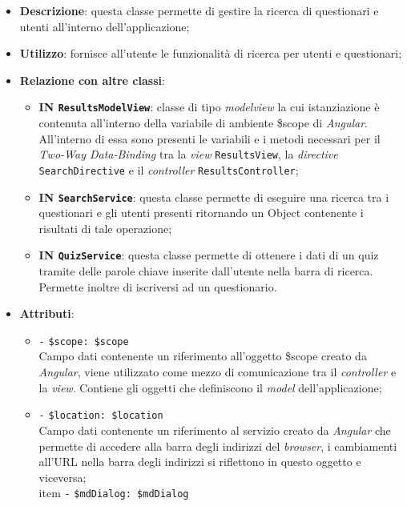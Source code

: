 \begin{itemize}
	\item \textbf{Descrizione}: questa classe permette di gestire la ricerca di questionari e utenti all'interno dell'applicazione;
	\item \textbf{Utilizzo}: fornisce all'utente le funzionalità di ricerca per utenti e questionari;
	\item \textbf{Relazione con altre classi}:
	\begin{itemize}
		\item \textbf{IN \texttt{ResultsModelView}}: classe di tipo \textit{modelview} la cui istanziazione è contenuta all'interno della variabile di ambiente \$scope di \textit{Angular}. All'interno di essa sono presenti le variabili e i metodi necessari per il \textit{Two-Way Data-Binding} tra la \textit{view} \texttt{ResultsView}, la \textit{directive} \texttt{SearchDirective} e il \textit{controller} \texttt{ResultsController};
		\item \textbf{IN \texttt{SearchService}}: questa classe permette di eseguire una ricerca tra i questionari e gli utenti presenti ritornando un Object contenente i risultati di tale operazione;
		\item \textbf{IN \texttt{QuizService}}: questa classe permette di ottenere i dati di un quiz tramite delle parole chiave inserite dall'utente nella barra di ricerca. Permette inoltre di iscriversi ad un questionario.
	\end{itemize}
	\item \textbf{Attributi}:
	\begin{itemize}
		\item \texttt{-} \texttt{\$scope: \$scope} \\
		Campo dati contenente un riferimento all'oggetto \$scope creato da \textit{Angular}, viene utilizzato come mezzo di comunicazione tra il \textit{controller} e la \textit{view}. Contiene gli oggetti che definiscono il \textit{model} dell'applicazione;
		\item \texttt{-} \texttt{\$location: \$location} \\
		Campo dati contenente un riferimento al servizio creato da \textit{Angular} che permette di accedere alla barra degli indirizzi del \textit{browser}, i cambiamenti all'URL nella barra degli indirizzi si riflettono in questo oggetto e viceversa;
		\\item \texttt{-} \texttt{\$mdDialog: \$mdDialog} \\

\end{itemize}
\end{itemize}
